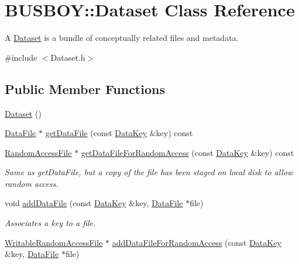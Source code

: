 \hypertarget{classBUSBOY_1_1Dataset}{
\section{BUSBOY::Dataset Class Reference}
\label{classBUSBOY_1_1Dataset}
}


A \hyperlink{classBUSBOY_1_1Dataset}{Dataset} is a bundle of conceptually related files and metadata.  


{\ttfamily \#include $<$Dataset.h$>$}\subsection*{Public Member Functions}
\begin{DoxyCompactItemize}
\item 
\hyperlink{classBUSBOY_1_1Dataset_aa524e8c1b07c915f28b4ae9c66c5265c}{Dataset} ()
\item 
\hyperlink{classBUSBOY_1_1DataFile}{DataFile} $\ast$ \hyperlink{classBUSBOY_1_1Dataset_ab30fc5affe15129e9bc79f1f612aedf9}{getDataFile} (const \hyperlink{classBUSBOY_1_1DataKey}{DataKey} \&key) const 
\item 
\hyperlink{classBUSBOY_1_1RandomAccessFile}{RandomAccessFile} $\ast$ \hyperlink{classBUSBOY_1_1Dataset_aae5ce5b61453bd714ac6361e682d2d33}{getDataFileForRandomAccess} (const \hyperlink{classBUSBOY_1_1DataKey}{DataKey} \&key) const 
\begin{DoxyCompactList}\small\item\em Same as getDataFile, but a copy of the file has been staged on local disk to allow random access. \item\end{DoxyCompactList}\item 
void \hyperlink{classBUSBOY_1_1Dataset_af6eac442d6a9fdb58c3914086968a4be}{addDataFile} (const \hyperlink{classBUSBOY_1_1DataKey}{DataKey} \&key, \hyperlink{classBUSBOY_1_1DataFile}{DataFile} $\ast$file)
\begin{DoxyCompactList}\small\item\em Associates a key to a file. \item\end{DoxyCompactList}\item 
\hyperlink{classBUSBOY_1_1WritableRandomAccessFile}{WritableRandomAccessFile} $\ast$ \hyperlink{classBUSBOY_1_1Dataset_af197d624275b6978aed7c687a897722a}{addDataFileForRandomAccess} (const \hyperlink{classBUSBOY_1_1DataKey}{DataKey} \&key, \hyperlink{classBUSBOY_1_1DataFile}{DataFile} $\ast$file)

\end{DoxyCompactItemize}

